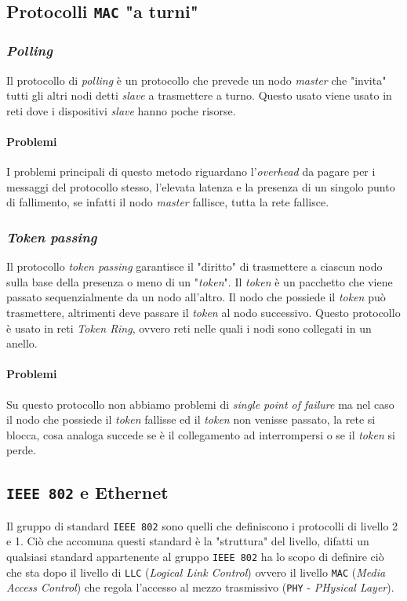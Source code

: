     \subsection{Protocolli \texttt{MAC} "a turni"}
        \subsubsection{\textit{Polling}}
            Il protocollo di \textit{polling} è un protocollo che prevede un nodo \textit{master} che "invita" tutti gli altri nodi detti \textit{slave} a trasmettere a turno. Questo usato viene usato in reti dove i dispositivi \textit{slave} hanno poche risorse.
            \paragraph{Problemi} I problemi principali di questo metodo riguardano l'\textit{overhead} da pagare per i messaggi del protocollo stesso, l'elevata latenza e la presenza di un singolo punto di fallimento, se infatti il nodo \textit{master} fallisce, tutta la rete fallisce.
        \subsubsection{\textit{Token passing}}
            Il protocollo \textit{token passing} garantisce il "diritto" di trasmettere a ciascun nodo sulla base della presenza o meno di un "\textit{token}". Il \textit{token} è un pacchetto che viene passato sequenzialmente da un nodo all'altro. Il nodo che possiede il \textit{token} può trasmettere, altrimenti deve passare il \textit{token} al nodo successivo. Questo protocollo è usato in reti \textit{Token Ring}, ovvero reti nelle quali i nodi sono collegati in un anello.
            \paragraph{Problemi} Su questo protocollo non abbiamo problemi di \textit{single point of failure} ma nel caso il nodo che possiede il \textit{token} fallisse ed il \textit{token} non venisse passato, la rete si blocca, cosa analoga succede se è il collegamento ad interrompersi o se il \textit{token} si perde.
    \subsection{\texttt{IEEE 802} e Ethernet}
        Il gruppo di standard \texttt{IEEE 802} sono quelli che definiscono i protocolli di livello 2 e 1. Ciò che accomuna questi standard è la "struttura" del livello, difatti un qualsiasi standard appartenente al gruppo \texttt{IEEE 802} ha lo scopo di definire ciò che sta dopo il livello di \texttt{LLC} (\textit{Logical Link Control}) ovvero il livello \texttt{MAC} (\textit{Media Access Control}) che regola l'accesso al mezzo trasmissivo (\texttt{PHY} - \textit{PHysical Layer}).
